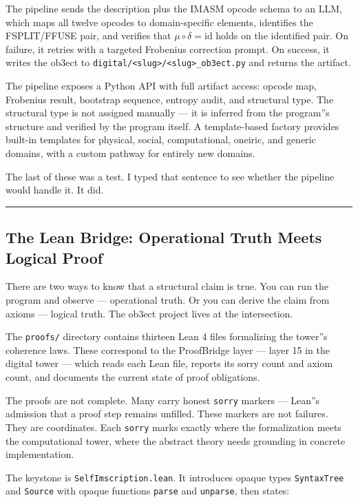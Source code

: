 \documentclass[12pt,a4paper]{article}
\begin{document}
The pipeline sends the description plus the IMASM opcode schema to an LLM, which maps all twelve opcodes to domain-specific elements, identifies the FSPLIT/FFUSE pair, and verifies that $\mu\circ\delta = \mathrm{id}$ holds on the identified pair. On failure, it retries with a targeted Frobenius correction prompt. On success, it writes the ob3ect to \texttt{digital/\textless{}slug\textgreater{}/\textless{}slug\textgreater{}\_ob3ect.py} and returns the artifact.

The pipeline exposes a Python API with full artifact access: opcode map, Frobenius result, bootstrap sequence, entropy audit, and structural type. The structural type is not assigned manually --- it is inferred from the program''s structure and verified by the program itself. A template-based factory provides built-in templates for physical, social, computational, oneiric, and generic domains, with a custom pathway for entirely new domains.

The last of these was a test. I typed that sentence to see whether the pipeline would handle it. It did.

\begin{center}
\rule{0.5\textwidth}{0.4pt}
\end{center}

\subsection{The Lean Bridge: Operational Truth Meets Logical Proof}

There are two ways to know that a structural claim is true. You can run the program and observe --- operational truth. Or you can derive the claim from axioms --- logical truth. The ob3ect project lives at the intersection.

The \texttt{proofs/} directory contains thirteen Lean 4 files formalizing the tower''s coherence laws. These correspond to the ProofBridge layer --- layer 15 in the digital tower --- which reads each Lean file, reports its sorry count and axiom count, and documents the current state of proof obligations.

The proofs are not complete. Many carry honest \texttt{sorry} markers --- Lean''s admission that a proof step remains unfilled. These markers are not failures. They are coordinates. Each \texttt{sorry} marks exactly where the formalization meets the computational tower, where the abstract theory needs grounding in concrete implementation.

The keystone is \texttt{SelfImscription.lean}. It introduces opaque types \texttt{SyntaxTree} and \texttt{Source} with opaque functions \texttt{parse} and \texttt{unparse}, then states:
\end{document}
